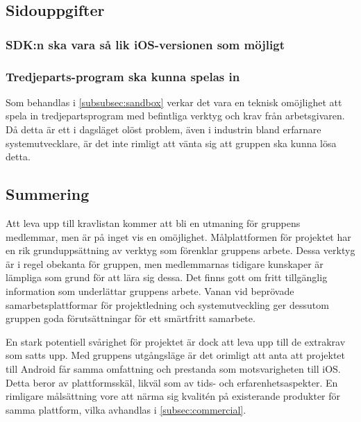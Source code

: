 \subsection{Sidouppgifter}
\subsubsection{SDK:n ska vara så lik iOS-versionen som möjligt}

\subsubsection{Tredjeparts-program ska kunna spelas in}
Som behandlas i \ref{subsubsec:sandbox} verkar det vara en teknisk omöjlighet att spela in tredjepartsprogram med befintliga verktyg och krav från arbetsgivaren. Då detta är ett i dagsläget olöst problem, även i industrin bland erfarnare systemutvecklare, är det inte rimligt att vänta sig att gruppen ska kunna lösa detta.

\subsection{Summering}
Att leva upp till kravlistan kommer att bli en utmaning för gruppens medlemmar, men är på inget vis en omöjlighet. Målplattformen för projektet har en rik grunduppsättning av verktyg som förenklar gruppens arbete. Dessa verktyg är i regel obekanta för gruppen, men medlemmarnas tidigare kunskaper är lämpliga som grund för att lära sig dessa. Det finns gott om fritt tillgänglig information som underlättar gruppens arbete. Vanan vid beprövade samarbetsplattformar för projektledning och systemutveckling ger dessutom gruppen goda förutsättningar för ett smärtfritt samarbete.

En stark potentiell svårighet för projektet är dock att leva upp till de extrakrav som satts upp. Med gruppens utgångsläge är det orimligt att anta att projektet till Android får samma omfattning och prestanda som motsvarigheten till iOS. Detta beror av plattformsskäl, likväl som av tids- och erfarenhetsaspekter. En rimligare målsättning vore att närma sig kvalitén på existerande produkter för samma plattform, vilka avhandlas i \ref{subsec:commercial}.
